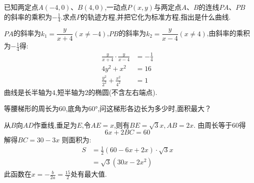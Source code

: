 \begin{questions}
\begin{solution}
\begin{enumerate}[label=\Roman*.]
		\end{enumerate}
	\end{solution}

	\question[10]
	已知两定点$A(-4,0)$、$B(4,0)$,一动点$P(x,y)$与两定点$A$、$B$的连线$PA$、$PB$的斜率的乘积为$-\frac14$.求点$P$的轨迹方程,并把它化为标准方程,指出是什么曲线.
	\begin{solution}
		$PA$的斜率为$k_1 = \dfrac{y}{x+4}(x \neq -4)$,$PB$的斜率为$k_2 = \dfrac{y}{x-4}(x \neq 4)$,由斜率的乘积为$-\frac14$得:
		\begin{align*}
			\frac{y}{x+4}\cdot\frac{y}{x-4}   & = -\frac14 \\
			4y^2 + x^2                        & = 16       \\
			\frac{y^2}{2^2} + \frac{x^2}{4^2} & = 1
		\end{align*}
		曲线是长半轴为$4$,短半轴为$2$的椭圆(不含左右端点).
	\end{solution}

	\question[10] 等腰梯形的周长为$60$,底角为\ang{60},问这梯形各边长为多少时,面积最大？
	\begin{figure*}[ht]
		\centering
	\end{figure*}

	\begin{solution}
		从$B$向$AD$作垂线,垂足为$E$,令$AE=x$,则有$BE=\sqrt{3}x, AB=2x$.
		由周长等于$60$得
		\begin{equation*}
			6x + 2BC = 60
		\end{equation*}
		解得$BC = 30 - 3x$
		则面积为:
		\begin{align*}
			S & = \frac12(60-6x + 2x)\cdot\sqrt{3}x \\
			  & = \sqrt{3}(30x - 2x^2)
		\end{align*}
		此函数在$x=-\frac{b}{2a} = \frac{15}{2}$处有最大值.


\end{solution}
\end{questions}
